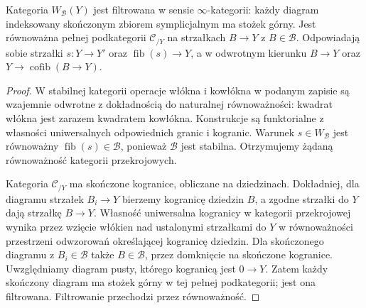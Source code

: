 \begin{stwierdzenie}\label{cat:prop:infty-verdier-filtered}
Kategoria $W_{\mathcal B}(Y)$ jest filtrowana w sensie $\infty$-kategorii: każdy diagram indeksowany skończonym zbiorem symplicjalnym ma stożek górny. Jest równoważna pełnej podkategorii $\mathcal C_{/Y}$ na strzałkach $B\to Y$ z $B\in\mathcal B$. Odpowiadają sobie strzałki $s:Y\to Y'$ oraz $\operatorname{fib}(s)\to Y$, a w odwrotnym kierunku $B\to Y$ oraz $Y\to\operatorname{cofib}(B\to Y)$.
\end{stwierdzenie}
\begin{proof}
W stabilnej kategorii operacje włókna i kowłókna w podanym zapisie są wzajemnie odwrotne z dokładnością do naturalnej równoważności: kwadrat włókna jest zarazem kwadratem kowłókna. Konstrukcje są funktorialne z własności uniwersalnych odpowiednich granic i kogranic. Warunek $s\in W_{\mathcal B}$ jest równoważny $\operatorname{fib}(s)\in\mathcal B$, ponieważ $\mathcal B$ jest stabilna. Otrzymujemy żądaną równoważność kategorii przekrojowych.

Kategoria $\mathcal C_{/Y}$ ma skończone kogranice, obliczane na dziedzinach. Dokładniej, dla diagramu strzałek $B_i\to Y$ bierzemy kogranicę dziedzin $B$, a zgodne strzałki do $Y$ dają strzałkę $B\to Y$. Własność uniwersalna kogranicy w kategorii przekrojowej wynika przez wzięcie włókien nad ustalonymi strzałkami do $Y$ w równoważności przestrzeni odwzorowań określającej kogranicę dziedzin. Dla skończonego diagramu z $B_i\in\mathcal B$ także $B\in\mathcal B$, przez domknięcie na skończone kogranice. Uwzględniamy diagram pusty, którego kogranicą jest $0\to Y$. Zatem każdy skończony diagram ma stożek górny w tej pełnej podkategorii; jest ona filtrowana. Filtrowanie przechodzi przez równoważność.
\end{proof}

